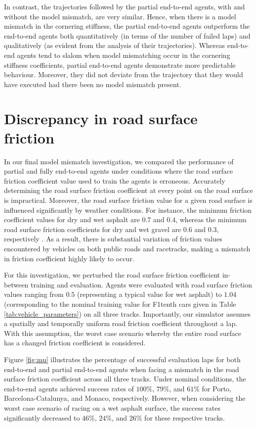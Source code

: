 In contrast, the trajectories followed by the partial end-to-end agents, with and without the model mismatch, are very similar.
Hence, when there is a model mismatch in the cornering stiffness, the partial end-to-end agents outperform the end-to-end agents both quantitatively (in terms of the number of failed laps) and qualitatively (as evident from the analysis of their trajectories).
Whereas end-to-end agents tend to slalom when model mismatching occur in the cornering stiffness coefficients, partial end-to-end agents demonstrate more predictable behaviour.
Moreover, they did not deviate from the trajectory that they would have executed had there been no model mismatch present.


\section{Discrepancy in road surface friction}

In our final model mismatch investigation, we compared the performance of partial and fully end-to-end agents under conditions where the road surface friction coefficient value used to train the agents is erroneous.
Accurately determining the road surface friction coefficient at every point on the road surface is impractical.
Moreover, the road surface friction value for a given road surface is influenced significantly by weather conditions.
For instance, the minimum friction coefficient values for dry and wet asphalt are $0.7$ and $0.4$, whereas the minimum road surface friction coefficients for dry and wet gravel are $0.6$ and $0.3$, respectively \cite{Novikov2018}. 
As a result, there is substantial variation of friction values encountered by vehicles on both public roads and racetracks, making a mismatch in friction coefficient highly likely to occur.

For this investigation, we perturbed the road surface friction coefficient in-between training and evaluation.
Agents were evaluated with road surface friction values ranging from $0.5$ (representing a typical value for wet asphalt) to $1.04$ (corresponding to the nominal training value for F1tenth cars given in Table \ref{tab:vehicle_parameters}) on all three tracks. 
Importantly, our simulator assumes a spatially and temporally uniform road friction coefficient throughout a lap.
With this assumption, the worst case scenario whereby the entire road surface has a changed friction coefficient is considered.


Figure \ref{fig:mu} illustrates the percentage of successful evaluation laps for both end-to-end and partial end-to-end agents when facing a mismatch in the road surface friction coefficient across all three tracks. 
Under nominal conditions, the end-to-end agents achieved success rates of $100\%$, $79\%$, and $61\%$ for Porto, Barcelona-Catalunya, and Monaco, respectively. However, when considering the worst case scenario of racing on a wet asphalt surface, the success rates significantly decreased to $46\%$, $24\%$, and $26\%$ for these respective tracks.


